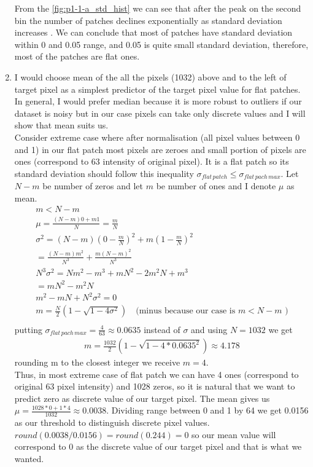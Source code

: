 \documentclass{article}
\begin{document}
\begin{enumerate}[label=(\alph*)]
				 	From the \ref{fig:p1-1-a_std_hist} we can see that after the peak on the second bin the number of patches declines exponentially as  standard deviation increases . We can conclude that most of patches have standard deviation within 0 and 0.05 range, and 0.05 is quite small standard deviation, therefore, most of the patches are flat ones. 
				\item
					I would choose mean of the all the pixels (1032) above and to the left of target pixel as a simplest predictor of the target pixel value for flat patches. In general, I would prefer median because it is more robust to outliers if our dataset is noisy but in our case pixels can take only discrete values and I will show that mean suits us.\\
					Consider extreme case where after normalisation (all pixel values between 0 and 1) in our flat patch  most pixels are zeroes and small portion of pixels are ones (correspond to 63 intensity of original pixel). It is a flat patch so its standard deviation should follow this inequality $\sigma_{flat \, patch} \leq \sigma_{flat \, pach \, max}$. Let $N-m$ be number of zeros and let $m$ be number of ones and I denote $\mu$ as mean. 
					\begin{gather*}
						m < N - m\\
						\mu = \frac{(N - m) 0 + m  1}{N} = \frac{m}{N}\\
						\sigma^2 = (N - m) (0 - \frac{m}{N})^2 + m(1 - \frac{m}{N})^2 \\
						= \frac{(N - m)m^2}{N^3} + \frac{m(N - m)^2}{N ^ 3}\\
						N^3\sigma^2 = Nm^2 - m^3 + mN^2 - 2m^2N + m^3 \\
						= mN^2-m^2N\\
						m^2 - mN + N^2\sigma^2 = 0\\
						m = \frac{N}{2}(1 - \sqrt{1 - 4 \sigma ^ 2})\quad\text{(minus because our case is $m < N - m$ )}\\
					\end{gather*}
					putting $\sigma_{flat \, pach \, max} = \frac{4}{63} \approx 0.0635$ instead of $\sigma$ and using $N = 1032$ we get
					\begin{gather*}
						m = \frac{1032}{2}(1 - \sqrt{1 - 4 * 0.0635^2}) \approx 4.178
					\end{gather*}
					rounding m to the closest integer we receive $m = 4$. \\Thus, in most extreme case of flat patch we can have 4 ones (correspond to original 63 pixel intensity) and 1028 zeros, so it is natural that we want to predict zero as discrete value of our target pixel.  The mean gives us $\mu = \frac{1028 * 0 + 1 * 4} {1032} \approx 0.0038$. Dividing range between 0 and 1 by 64 we get 0.0156 as our threshold to distinguish discrete pixel values. $round(0.0038/0.0156)=round(0.244)=0$ so our mean value will correspond to 0 as the discrete value of our target pixel and that is what we wanted.

\end{enumerate}
\end{document}

